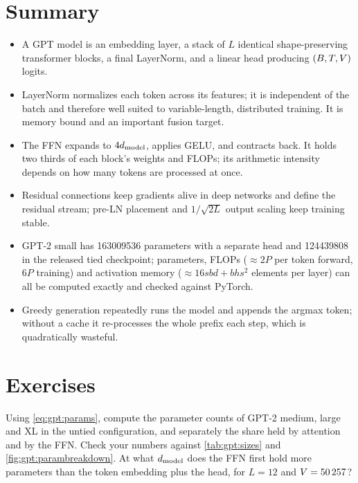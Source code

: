 \section{Summary}
\begin{itemize}
\item A GPT model is an embedding layer, a stack of $L$ identical shape-preserving transformer
  blocks, a final LayerNorm, and a linear head producing $(B,T,V)$ logits.
\item LayerNorm normalizes each token across its features; it is independent of the batch and
  therefore well suited to variable-length, distributed training. It is memory bound and an
  important fusion target.
\item The FFN expands to $4d_{\text{model}}$, applies GELU, and contracts back. It holds two thirds of each
  block's weights and FLOPs; its arithmetic intensity depends on how many tokens are processed at once.
\item Residual connections keep gradients alive in deep networks and define the residual stream;
  pre-LN placement and $1/\sqrt{2L}$ output scaling keep training stable.
\item GPT-2 small has \num{163009536} parameters with a separate head and \num{124439808} in the
  released tied checkpoint; parameters, FLOPs ($\approx 2P$ per token forward, $6P$ training) and
  activation memory ($\approx 16sbd+bhs^2$ elements per layer) can all be computed exactly and checked
  against PyTorch.
\item Greedy generation repeatedly runs the model and appends the argmax token; without a cache it
  re-processes the whole prefix each step, which is quadratically wasteful.
\end{itemize}

\section{Exercises}

\begin{exercise}
Using \cref{eq:gpt:params}, compute the parameter counts of GPT-2 medium, large and XL in the
untied configuration, and separately the share held by attention and by the FFN. Check your numbers
against \cref{tab:gpt:sizes} and \cref{fig:gpt:parambreakdown}. At what $d_{\text{model}}$ does the FFN first
hold more parameters than the token embedding plus the head, for $L=12$ and $V=\num{50257}$?
\end{exercise}

